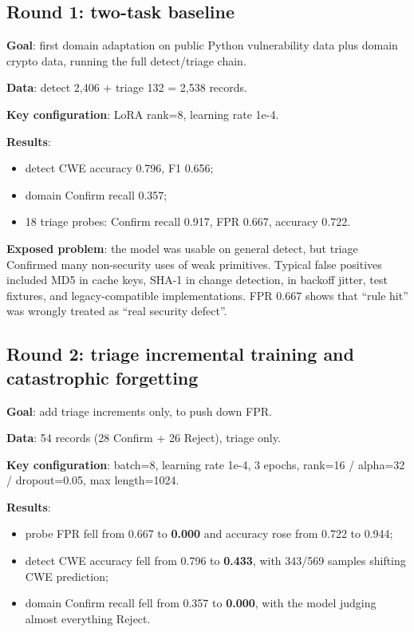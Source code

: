 \documentclass[11pt]{article}
\newcommand{\code}[1]{\texttt{\detokenize{#1}}}
\begin{document}
\subsection{Round 1: two-task baseline}

\textbf{Goal}: first domain adaptation on public Python vulnerability data plus domain crypto data, running the
full detect/triage chain.

\textbf{Data}: detect 2,406 + triage 132 = 2,538 records.

\textbf{Key configuration}: LoRA rank=8, learning rate 1e-4.

\textbf{Results}:

\begin{itemize}
  \item detect CWE accuracy 0.796, F1 0.656;
  \item domain Confirm recall 0.357;
  \item 18 triage probes: Confirm recall 0.917, FPR 0.667, accuracy 0.722.
\end{itemize}

\textbf{Exposed problem}: the model was usable on general detect, but triage Confirmed many non-security uses
of weak primitives. Typical false positives included MD5 in cache keys, SHA-1 in change detection,
\code{random} in backoff jitter, test fixtures, and legacy-compatible implementations. FPR 0.667 shows that
``rule hit'' was wrongly treated as ``real security defect''.

\subsection{Round 2: triage incremental training and catastrophic forgetting}

\textbf{Goal}: add triage increments only, to push down FPR.

\textbf{Data}: 54 records (28 Confirm + 26 Reject), triage only.

\textbf{Key configuration}: batch=8, learning rate 1e-4, 3 epochs, rank=16 / alpha=32 / dropout=0.05,
max length=1024.

\textbf{Results}:

\begin{itemize}
  \item probe FPR fell from 0.667 to \textbf{0.000} and accuracy rose from 0.722 to 0.944;
  \item detect CWE accuracy fell from 0.796 to \textbf{0.433}, with 343/569 samples shifting CWE prediction;
  \item domain Confirm recall fell from 0.357 to \textbf{0.000}, with the model judging almost everything
        Reject.
\end{itemize}
\end{document}
